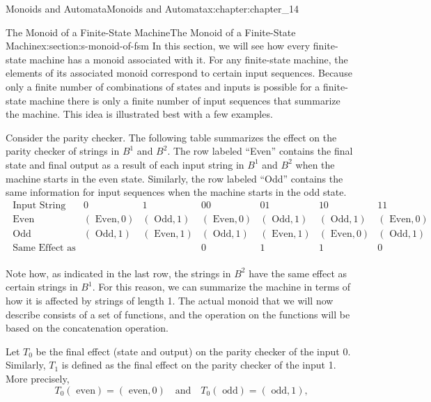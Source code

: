 \documentclass[twoside,10pt,]{book}
\numberwithin{equation}{section}
\begin{document}
\begin{chapterptx}{Monoids and Automata}{}{Monoids and Automata}{}{}{x:chapter:chapter_14}
\begin{sectionptx}{The Monoid of a Finite-State Machine}{}{The Monoid of a Finite-State Machine}{}{}{x:section:s-monoid-of-fsm}
%
In this section, we will see how every finite-state machine has a monoid associated with it. For any finite-state machine, the elements of its associated monoid correspond to certain input sequences. Because only a finite number of combinations of states and inputs is possible for a finite-state machine there is only a finite number of input sequences that summarize the machine. This idea is illustrated best with a few examples.%
\par
Consider the parity checker. The following table summarizes the effect on the parity checker of strings in \(B^1\) and \(B^2\). The row labeled ``Even'' contains the final state and final output as a result of each input string in \(B^1\) and \(B^2\) when the machine starts in the even state. Similarly, the row labeled ``Odd'' contains the same information for input sequences when the machine starts in the odd state.%
\begin{equation*}
\begin{array}{c|cccccc}
\textrm{ Input} \textrm{ String} & 0 & 1 & 00 & 01 & 10 & 11 \\
\hline
\textrm{ Even} & (\textrm{ Even},0) & (\textrm{ Odd},1) & (\textrm{ Even},0) & (\textrm{ Odd},1) & (\textrm{ Odd},1) & (\textrm{ Even},0) \\
\textrm{ Odd} & (\textrm{ Odd},1) & (\textrm{ Even},1) & (\textrm{ Odd},1) & (\textrm{ Even},1) & (\textrm{ Even},0) & (\textrm{ Odd},1) \\
\textrm{ Same} \textrm{ Effect} \textrm{ as} &   &   & 0 & 1 & 1 & 0 \\
\end{array}
\end{equation*}
%
\par
Note how, as indicated in the last row, the strings in \(B^2\) have the same effect as certain strings in \(B^1\). For this reason, we can summarize the machine in terms of how it is affected by strings of length 1. The actual monoid that we will now describe consists of a set of functions, and the operation on the functions will be based on the concatenation operation.%
\par
Let \(T_0\) be the final effect (state and output) on the parity checker of the input 0. Similarly, \(T_1\) is defined as the final effect on the parity checker of the input 1.  More precisely,%
\begin{equation*}
T_0(\textrm{ even})=(\textrm{ even},0)  \quad \textrm{and} \quad  T_0(\textrm{ odd})=(\textrm{ odd},1)\textrm{,}
\end{equation*}

\end{sectionptx}
\end{chapterptx}
\end{document}
